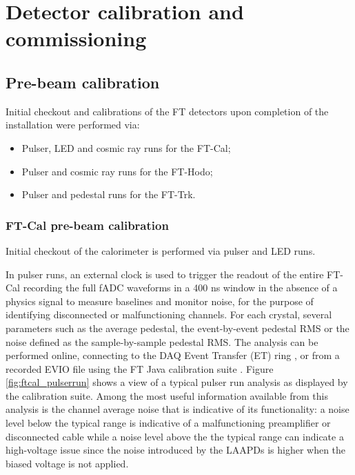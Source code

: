 \section{Detector calibration and commissioning}

\subsection{Pre-beam calibration}
Initial checkout and calibrations of the FT detectors upon completion of the installation were performed via:
\begin{itemize}
    \item Pulser, LED and cosmic ray runs for the FT-Cal;
    \item Pulser and cosmic ray runs for the FT-Hodo;
    \item Pulser and pedestal runs for the FT-Trk.
\end{itemize}

\subsubsection{FT-Cal pre-beam calibration}
Initial checkout of the calorimeter is performed via pulser and LED runs. 

In pulser runs, an external clock is used to trigger the readout of the entire FT-Cal recording the full fADC waveforms in a 400 ns window in the absence of a physics signal to measure baselines and monitor noise, for the purpose of identifying disconnected or malfunctioning channels. For each crystal, several parameters such as the average pedestal, the event-by-event pedestal RMS or the noise defined as the sample-by-sample pedestal RMS. The analysis can be performed online, connecting to the DAQ Event Transfer (ET) ring \cite{daq}, or from a recorded EVIO file using the FT Java calibration suite \cite{reconstruction}. Figure \ref{fig:ftcal_pulserrun} shows a view of a typical pulser run analysis as displayed by the calibration suite. Among the most useful information available from this analysis is the channel average noise that is indicative of its functionality: a noise level below the typical range is indicative of a malfunctioning preamplifier or disconnected cable while a noise level above the the typical range can indicate a high-voltage issue since the noise introduced by the LAAPDs is higher when the biased voltage is not applied. 

